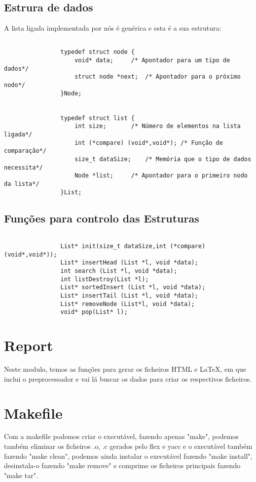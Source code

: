 \documentclass[11pt, a4paper]{report}
\begin{document}
\subsection{Estrura de dados}
A lista ligada implementada por nós é genérica e esta é a sua estrutura:\\
\begin{verbatim}

				typedef struct node {
				    void* data;    	/* Apontador para um tipo de dados*/
				    struct node *next;	/* Apontador para o próximo nodo*/
				}Node;


				typedef struct list {
				    int size;    	/* Número de elementos na lista ligada*/
				    int (*compare) (void*,void*); /* Função de comparação*/
				    size_t dataSize;	/* Memória que o tipo de dados necessita*/
				    Node *list;		/* Apontador para o primeiro nodo da lista*/
				}List;
			\end{verbatim}
\subsection{Funções para controlo das Estruturas}
\begin{verbatim}

				List* init(size_t dataSize,int (*compare) (void*,void*));
				List* insertHead (List *l, void *data);
				int search (List *l, void *data);
				int listDestroy(List *l);
				List* sortedInsert (List *l, void *data);
				List* insertTail (List *l, void *data);
				List* removeNode (List*l, void *data);
				void* pop(List* l);
			\end{verbatim}
\section{Report}
Neste modulo, temos as funções para gerar os ficheiros HTML e LaTeX, em que inclui o preprocessador e vai lá buscar os dados para criar os respectivos ficheiros.\\
\section{Makefile}
Com a makefile podemos criar o executável, fazendo apenas "make", podemos também eliminar os ficheiros .o, .c gerados pelo flex e yacc e o executável também fazendo "make clean", podemos ainda instalar o executável fazendo "make install", desinstala-o fazendo "make remove" e comprime os ficheiros principais fazendo "make tar".\\
\end{document}
